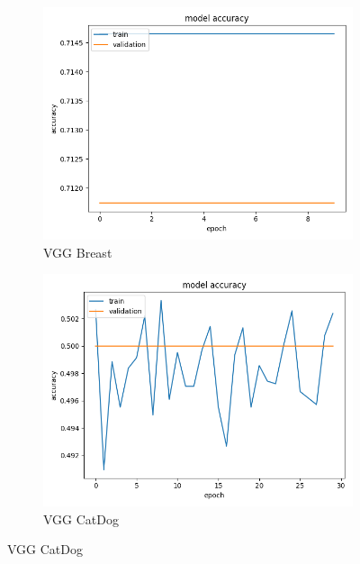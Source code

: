 \begin{figure}
\begin{subfigure}[b]{.45\linewidth}
\includegraphics[width=\linewidth]{Figs/vgg_breast_acc.jpg}
\caption{VGG Breast}
\end{subfigure}
\begin{subfigure}[b]{.45\linewidth}
\includegraphics[width=\linewidth]{Figs/vgg_catdog_acc.jpg}
\caption{VGG CatDog}
\end{subfigure}


\end{figure}
